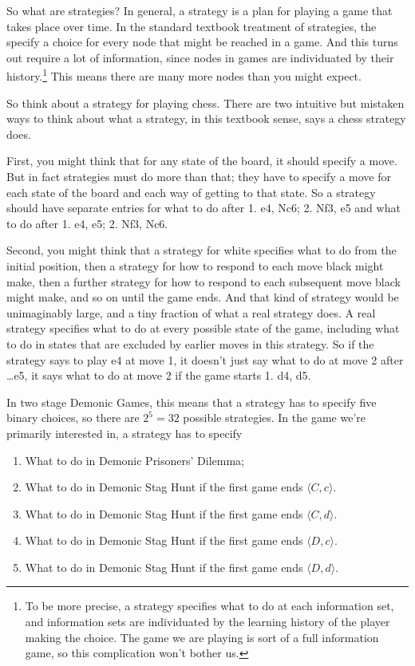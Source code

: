 \documentclass[
  12pt,
]{article}
\providecommand{\tightlist}{%
  \setlength{\itemsep}{0pt}\setlength{\parskip}{0pt}}
\begin{document}
So what are strategies? In general, a strategy is a plan for playing a
game that takes place over time. In the standard textbook treatment of
strategies, the specify a choice for every node that might be reached in
a game. And this turns out require a lot of information, since nodes in
games are individuated by their history.\footnote{To be more precise, a
  strategy specifies what to do at each information set, and information
  sets are individuated by the learning history of the player making the
  choice. The game we are playing is sort of a full information game, so
  this complication won't bother us.} This means there are many more
nodes than you might expect.

So think about a strategy for playing chess. There are two intuitive but
mistaken ways to think about what a strategy, in this textbook sense,
says a chess strategy does.

First, you might think that for any state of the board, it should
specify a move. But in fact strategies must do more than that; they have
to specify a move for each state of the board and each way of getting to
that state. So a strategy should have separate entries for what to do
after 1. e4, Nc6; 2. Nf3, e5 and what to do after 1. e4, e5; 2. Nf3,
Nc6.

Second, you might think that a strategy for white specifies what to do
from the initial position, then a strategy for how to respond to each
move black might make, then a further strategy for how to respond to
each subsequent move black might make, and so on until the game ends.
And that kind of strategy would be unimaginably large, and a tiny
fraction of what a real strategy does. A real strategy specifies what to
do at every possible state of the game, including what to do in states
that are excluded by earlier moves in this strategy. So if the strategy
says to play e4 at move 1, it doesn't just say what to do at move 2
after \ldots e5, it says what to do at move 2 if the game starts 1. d4,
d5.

In two stage Demonic Games, this means that a strategy has to specify
five binary choices, so there are \(2^5 = 32\) possible strategies. In
the game we're primarily interested in, a strategy has to specify

\begin{enumerate}
\def\labelenumi{\arabic{enumi}.}
\tightlist
\item
  What to do in Demonic Prisoners' Dilemma;
\item
  What to do in Demonic Stag Hunt if the first game ends
  \(\langle C, c \rangle\).
\item
  What to do in Demonic Stag Hunt if the first game ends
  \(\langle C, d \rangle\).
\item
  What to do in Demonic Stag Hunt if the first game ends
  \(\langle D, c \rangle\).
\item
  What to do in Demonic Stag Hunt if the first game ends
  \(\langle D, d \rangle\).
\end{enumerate}
\end{document}
